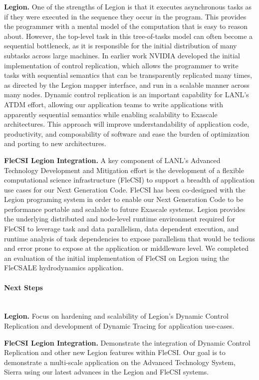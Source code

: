 \textbf{Legion.} 
One of the strengths of Legion is that it executes asynchronous tasks as if they were executed in the sequence they occur in the program. This provides the programmer with a mental model of the computation that is easy to reason about. However, the top-level task in this tree-of-tasks model can often become a sequential bottleneck, as it is responsible for the initial distribution of many subtasks across large machines. In earlier work NVIDIA developed the initial implementation of control replication, which allows the programmer to write tasks with sequential semantics that can be  transparently replicated many times, as directed by the Legion mapper interface, and run in a scalable manner across many nodes.
Dynamic control replication is an important capability for LANL's ATDM effort, allowing our application teams to write applications with apparently sequential semantics while enabling scalability to Exascale architectures. This approach will improve understandability of application code, productivity, and composability of software and ease the burden of optimization and porting to new architectures. 


\textbf{FleCSI Legion Integration.} A key component of LANL's Advanced Technology  Development and Mitigation effort is the development of a flexible computational science infrastructure (FleCSI) to support a breadth of application use cases for our Next Generation Code. FleCSI has been co-designed with the Legion programing system in order to enable our Next Generation Code to be performance portable and scalable to future Exascale systems. Legion provides the underlying distributed and node-level runtime environment required for FleCSI to leverage task and data parallelism, data dependent execution, and runtime analysis of task dependencies to expose parallelism that would be tedious and error prone to expose at the application or middleware level. We completed an evaluation of the initial implementation of FleCSI on Legion using the FleCSALE hydrodynamics application. 



\paragraph{Next Steps}  \leavevmode \\


\textbf{Legion.} Focus on hardening and scalability of Legion's Dynamic Control Replication and development of Dynamic Tracing for application use-cases. 

\textbf{FleCSI Legion Integration.} Demonstrate the integration of Dynamic Control Replication and other new Legion features within FleCSI. Our goal is to demonstrate a multi-scale application on the Advanced Technology System, Sierra using our latest advances in the Legion and FleCSI systems. 

